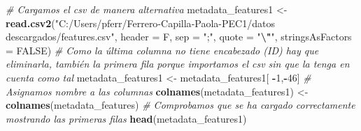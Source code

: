 \documentclass[
]{article}
\newenvironment{Shaded}{\begin{snugshade}}{\end{snugshade}}
\newcommand{\AttributeTok}[1]{\textcolor[rgb]{0.13,0.29,0.53}{#1}}
\newcommand{\CommentTok}[1]{\textcolor[rgb]{0.56,0.35,0.01}{\textit{#1}}}
\newcommand{\ConstantTok}[1]{\textcolor[rgb]{0.56,0.35,0.01}{#1}}
\newcommand{\DecValTok}[1]{\textcolor[rgb]{0.00,0.00,0.81}{#1}}
\newcommand{\FunctionTok}[1]{\textcolor[rgb]{0.13,0.29,0.53}{\textbf{#1}}}
\newcommand{\NormalTok}[1]{#1}
\newcommand{\OtherTok}[1]{\textcolor[rgb]{0.56,0.35,0.01}{#1}}
\newcommand{\SpecialCharTok}[1]{\textcolor[rgb]{0.81,0.36,0.00}{\textbf{#1}}}
\newcommand{\StringTok}[1]{\textcolor[rgb]{0.31,0.60,0.02}{#1}}
\begin{document}
\begin{Shaded}
\begin{Highlighting}[]
\CommentTok{\# Cargamos el csv de manera alternativa}
\NormalTok{metadata\_features1 }\OtherTok{\textless{}{-}} \FunctionTok{read.csv2}\NormalTok{(}\StringTok{"C:/Users/pferr/Ferrero{-}Capilla{-}Paola{-}PEC1/datos descargados/features.csv"}\NormalTok{, }\AttributeTok{header =}\NormalTok{ F, }\AttributeTok{sep =} \StringTok{";"}\NormalTok{, }\AttributeTok{quote =} \StringTok{"}\SpecialCharTok{\textbackslash{}"}\StringTok{"}\NormalTok{, }\AttributeTok{stringsAsFactors =} \ConstantTok{FALSE}\NormalTok{)}
\CommentTok{\# Como la última columna no tiene encabezado (ID) hay que eliminarla, también la primera fila porque importamos el csv sin que la tenga en cuenta como tal}
\NormalTok{metadata\_features1 }\OtherTok{\textless{}{-}}\NormalTok{ metadata\_features1[ }\SpecialCharTok{{-}}\DecValTok{1}\NormalTok{,}\SpecialCharTok{{-}}\DecValTok{46}\NormalTok{]}
\CommentTok{\# Asignamos nombre a las columnas}
\FunctionTok{colnames}\NormalTok{(metadata\_features1) }\OtherTok{\textless{}{-}} \FunctionTok{colnames}\NormalTok{(metadata\_features)}
\CommentTok{\# Comprobamos que se ha cargado correctamente mostrando las primeras filas}
\FunctionTok{head}\NormalTok{(metadata\_features1)}
\end{Highlighting}
\end{Shaded}
\end{document}
